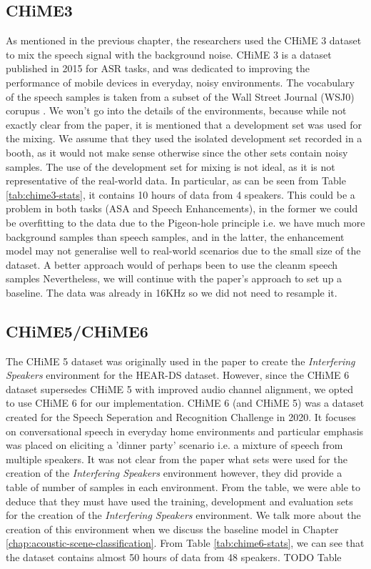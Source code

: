 \documentclass[logo,bsc,singlespacing,parskip,online]{infthesis}
\begin{document}
\subsection{CHiME3}
As mentioned in the previous chapter, the researchers used the CHiME 3 dataset to mix the speech signal with the background noise. 
CHiME 3 is a dataset published in 2015 for ASR tasks, and was dedicated to improving the performance of mobile devices 
in everyday, noisy environments. The vocabulary of the speech samples is taken from a subset of the Wall Street Journal (WSJ0) corupus \cite{TODO}.
We won't go into the details of the environments, because while not exactly clear from 
the paper, it is mentioned that a development set was used for the mixing. We assume that they used the isolated development set 
recorded in a booth, as it would not make sense otherwise since the other sets contain noisy samples.
The use of the development set for mixing is not ideal, as it is not representative of the real-world data.
In particular, as can be seen from Table \ref{tab:chime3-stats}, it contains 10 hours of data from 4 speakers. This could be a problem in both tasks (ASA and Speech Enhancements), in the former
we could be overfitting to the data due to the Pigeon-hole principle i.e. we have much more background samples than speech samples, 
and in the latter, the enhancement model may not generalise well to real-world scenarios due to the small size of the dataset. 
A better approach would of perhaps been to use the cleanm speech samples 
Nevertheless, we will continue with the paper's approach to set up a baseline. The data was already in 16KHz so we did not need to 
resample it. 
\subsection{CHiME5/CHiME6}
The CHiME 5 dataset was originally used in the paper to create the \textit{Interfering Speakers} environment for the HEAR-DS dataset.
However, since the CHiME 6 dataset supersedes CHiME 5 with improved audio channel alignment, we opted to use CHiME 6 for our implementation.
CHiME 6 (and CHiME 5) was a dataset created for the Speech Seperation and Recognition Challenge in 2020. It 
focuses on conversational speech in everyday home environments and particular emphasis was placed on 
eliciting a 'dinner party' scenario i.e. a mixture of speech from multiple speakers. It was not 
clear from the paper what sets were used for the creation of the \textit{Interfering Speakers} environment 
however, they did provide a table of number of samples in each environment. From the table, we 
were able to deduce that they must have used the training, development and evaluation sets for the creation of the \textit{Interfering Speakers} environment.
We talk more about the creation of this environment when we discuss the baseline model in Chapter \ref{chap:acoustic-scene-classification}.
From Table \ref{tab:chime6-stats}, we can see that the dataset contains almost 50 hours of data from 48 speakers. 
\label{sec:chime6}
TODO Table
\end{document}
